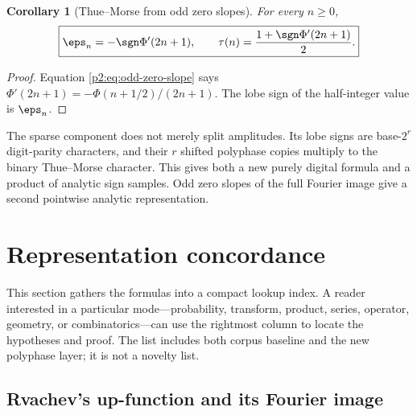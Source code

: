 \documentclass[11pt,oneside]{article}
\newtheorem{corollary}[theorem]{Corollary}
\theoremstyle{definition}
\begin{document}
\begin{corollary}[Thue--Morse from odd zero slopes]
\label{p2:cor:TM-zero-slopes}
For every $n\ge0$,
\begin{equation}
 \boxed{\displaystyle
 \eps_n=-\sgn\Phi'(2n+1),
 \qquad
 \tau(n)=\frac{1+\sgn\Phi'(2n+1)}2.}                      \label{p2:eq:TM-zero-slope-sign}
\end{equation}
\end{corollary}

\begin{proof}
Equation \eqref{p2:eq:odd-zero-slope} says
$\Phi'(2n+1)=-\Phi(n+1/2)/(2n+1)$.  The lobe sign of the half-integer value is
$\eps_n$.
\end{proof}

\begin{resultbox}
The sparse component does not merely split amplitudes.  Its lobe signs are
base-$2^r$ digit-parity characters, and their $r$ shifted polyphase copies
multiply to the binary Thue--Morse character.  This gives both a new purely
digital formula and a product of analytic sign samples.  Odd zero slopes of the
full Fourier image give a second pointwise analytic representation.
\end{resultbox}

\section{Representation concordance}
\label{p2:sec:concordance}

This section gathers the formulas into a compact lookup index.  A reader
interested in a particular mode---probability, transform, product, series,
operator, geometry, or combinatorics---can use the rightmost column to locate
the hypotheses and proof.  The list includes both corpus baseline and the new
polyphase layer; it is not a novelty list.

\subsection{Rvachev's up-function and its Fourier image}
\end{document}
